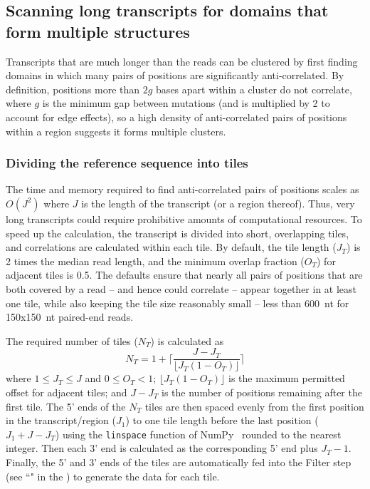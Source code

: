 \documentclass{article}
\begin{document}
\subsection{Scanning long transcripts for domains that form multiple structures}
\label{filterscan-clusterscan}

Transcripts that are much longer than the reads can be clustered by first finding domains in which many pairs of positions are significantly anti-correlated.
By definition, positions more than $2g$ bases apart within a cluster do not correlate, where $g$ is the minimum gap between mutations (and is multiplied by 2 to account for edge effects), so a high density of anti-correlated pairs of positions within a region suggests it forms multiple clusters.

\subsubsection{Dividing the reference sequence into tiles}

The time and memory required to find anti-correlated pairs of positions scales as $O(J^2)$ where $J$ is the length of the transcript (or a region thereof).
Thus, very long transcripts could require prohibitive amounts of computational resources.
To speed up the calculation, the transcript is divided into short, overlapping tiles, and correlations are calculated within each tile.
By default, the tile length ($J_T$) is 2 times the median read length, and the minimum overlap fraction ($O_T$) for adjacent tiles is 0.5.
The defaults ensure that nearly all pairs of positions that are both covered by a read -- and hence could correlate -- appear together in at least one tile, while also keeping the tile size reasonably small -- less than 600~nt for 150x150~nt paired-end reads.

The required number of tiles ($N_T$) is calculated as
\begin{equation}
    N_T = 1 + \lceil \frac{J - J_T}{\lfloor J_T (1 - O_T) \rfloor} \rceil
\end{equation}
where $1 \le J_T \le J$ and $0 \le O_T < 1$; $\lfloor J_T (1 - O_T) \rfloor$ is the maximum permitted offset for adjacent tiles; and $J - J_T$ is the number of positions remaining after the first tile.
The 5' ends of the $N_T$ tiles are then spaced evenly from the first position in the transcript/region ($J_1$) to one tile length before the last position ($J_1 + J - J_T$) using the \verb|linspace| function of NumPy~\cite{Harris2020} rounded to the nearest integer.
Then each 3' end is calculated as the corresponding 5' end plus $J_T - 1$.
Finally, the 5' and 3' ends of the tiles are automatically fed into the Filter step (see ``" in the ) to generate the data for each tile.
\end{document}
